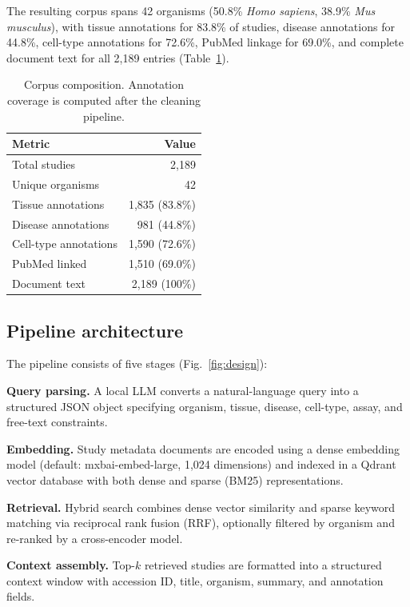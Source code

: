 \documentclass[sn-nature]{sn-jnl}
\begin{document}
The resulting corpus spans 42 organisms (50.8\% \textit{Homo sapiens},
38.9\% \textit{Mus musculus}), with tissue annotations for 83.8\% of
studies, disease annotations for 44.8\%, cell-type annotations for 72.6\%,
PubMed linkage for 69.0\%, and complete document text for all 2{,}189
entries (Table~\ref{tab:corpus}).

\begin{table}[t]
\caption{Corpus composition. Annotation coverage is computed after the
  cleaning pipeline.}\label{tab:corpus}
\begin{tabular}{lr}
\toprule
Metric & Value \\
\midrule
Total studies          & 2{,}189       \\
Unique organisms       & 42            \\
Tissue annotations     & 1{,}835 (83.8\%) \\
Disease annotations    & 981 (44.8\%)  \\
Cell-type annotations  & 1{,}590 (72.6\%) \\
PubMed linked          & 1{,}510 (69.0\%) \\
Document text          & 2{,}189 (100\%) \\
\bottomrule
\end{tabular}
\end{table}

\subsection{Pipeline architecture}\label{sec:pipeline}

The pipeline consists of five stages (Fig.~\ref{fig:design}):

\textbf{Query parsing.} A local LLM converts a natural-language query into
a structured JSON object specifying organism, tissue, disease, cell-type,
assay, and free-text constraints.

\textbf{Embedding.} Study metadata documents are encoded using a dense
embedding model (default: mxbai-embed-large, 1{,}024 dimensions) and indexed
in a Qdrant vector database with both dense and sparse (BM25)
representations.

\textbf{Retrieval.} Hybrid search combines dense vector similarity and
sparse keyword matching via reciprocal rank fusion (RRF), optionally filtered
by organism and re-ranked by a cross-encoder model.

\textbf{Context assembly.} Top-$k$ retrieved studies are formatted into a
structured context window with accession ID, title, organism, summary, and
annotation fields.
\end{document}
